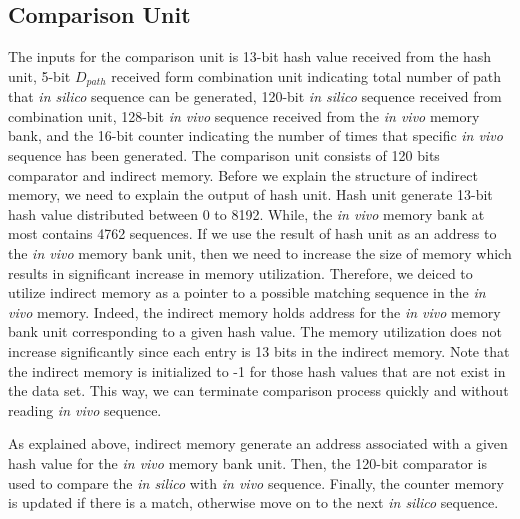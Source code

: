 \subsection{Comparison Unit}
The inputs for the comparison unit is 13-bit hash value received from the hash unit, 5-bit $D_{path}$ received form combination unit indicating total number of path that \emph{in silico} sequence can be generated, 120-bit \emph{in silico} sequence received from combination unit,  128-bit \emph{in vivo} sequence received from the \emph{in vivo} memory bank, and the 16-bit counter indicating the number of times that specific \emph{in vivo} sequence has been generated. The comparison unit consists of 120 bits comparator and indirect memory. Before we explain the structure of indirect memory, we need to explain the output of hash unit. Hash unit generate 13-bit hash value distributed between 0 to 8192. While, the \emph{in vivo} memory bank at most contains 4762 sequences. If we use the result of hash unit as an address to the \emph{in vivo} memory bank unit, then we need to increase the size of memory which results in significant increase in memory utilization. Therefore, we deiced to utilize indirect memory as a pointer to a possible matching sequence in the \emph{in vivo} memory. Indeed, the indirect memory holds address for the \emph{in vivo} memory bank unit corresponding to a given hash value. The memory utilization does not increase significantly since each entry is 13 bits in the indirect memory. Note that the indirect memory is initialized to -1 for those hash values that are not exist in the data set. This way,  we can terminate comparison process quickly and without reading \emph{in vivo} sequence. 

As explained above, indirect memory generate an address associated with a given hash value for the \emph{in vivo} memory bank unit. Then, the 120-bit comparator is used to compare the \emph{in silico} with \emph{in vivo} sequence. Finally, the counter memory is updated if there is a match, otherwise move on to the next \emph{in silico} sequence.

